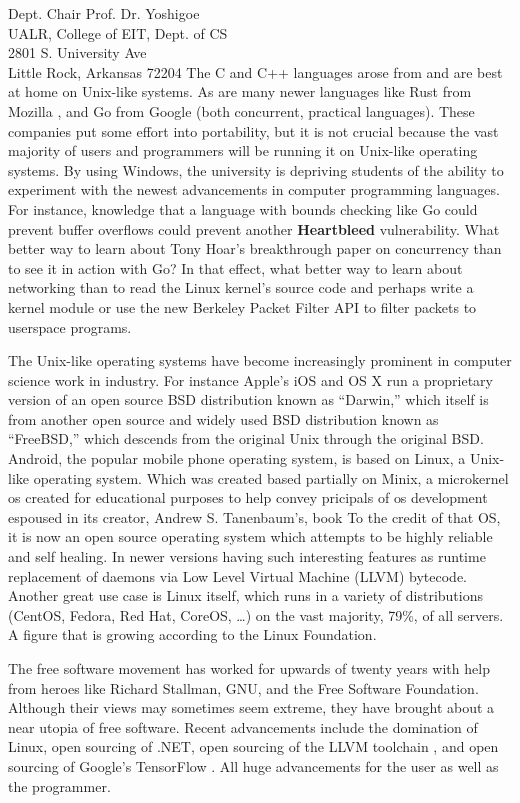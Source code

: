 \documentclass{letter}
\begin{document}
\begin{letter}{
    Dept. Chair Prof. Dr. Yoshigoe \\
    UALR, College of EIT, Dept. of CS \\
    2801 S. University Ave \\
    Little Rock, Arkansas 72204
  }
    The C and C++ languages arose from and are best at home on Unix-like systems. As are many newer languages like Rust from Mozilla \cite{RustLang}, and Go from Google \cite{Golang} (both concurrent, practical languages). These companies put some effort into portability, but it is not crucial because the vast majority of users and programmers will be running it on Unix-like operating systems. By using Windows, the university is depriving students of the ability to experiment with the newest advancements in computer programming languages. For instance, knowledge that a language with bounds checking like Go could prevent buffer overflows could prevent another {\bf Heartbleed} vulnerability. What better way to learn about Tony Hoar's breakthrough paper on concurrency than to see it in action with Go? In that effect, what better way to learn about networking than to read the Linux kernel's source code and perhaps write a kernel module or use the new Berkeley Packet Filter API to filter packets to userspace programs.

    The Unix-like operating systems have become increasingly prominent in computer science work in industry. For instance Apple's iOS and OS X run a proprietary version of an open source BSD distribution known as ``Darwin,'' which itself is from another open source and widely used BSD distribution known as ``FreeBSD,'' which descends from the original Unix through the original BSD. Android, the popular mobile phone operating system, is based on Linux, a Unix-like operating system. Which was created based partially on Minix, a microkernel \gls{os} created for educational purposes to help convey pricipals of \gls{os} development espoused in its creator, Andrew S. Tanenbaum's, book \cite{Tanenbaum:2005:OSD:1076555} To the credit of that OS, it is now an open source operating system which attempts to be highly reliable and self healing. In newer versions having such interesting features as runtime replacement of daemons via Low Level Virtual Machine (LLVM) bytecode. Another great use case is Linux itself, which runs in a variety of distributions (CentOS, Fedora, Red Hat, CoreOS, \ldots) on the vast majority, 79\%, of all servers. A figure that is growing according to the Linux Foundation.

    The free software movement has worked for upwards of twenty years with help from heroes like Richard Stallman, GNU, and the Free Software Foundation. Although their views may sometimes seem extreme, they have brought about a near utopia of free software. Recent advancements include the domination of Linux, open sourcing of .NET, open sourcing of the LLVM toolchain \cite{LLVMComp}, and open sourcing of Google's TensorFlow \cite{WiredTensorFlow}. All huge advancements for the user as well as the programmer.


\end{letter}
\end{document}
